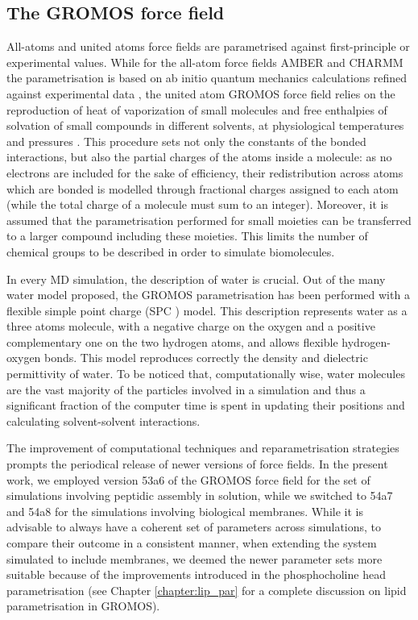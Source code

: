 \subsection{The GROMOS force field}
All-atoms and united atoms force fields are parametrised against first-principle or experimental values.
%
While for the all-atom force fields AMBER and CHARMM the parametrisation is based on ab initio quantum mechanics calculations refined against experimental data \cite{Maier2015,Dickson2014,Wang2004_amber,MacKerell1998,Klauda2010}, the united atom GROMOS force field relies on the reproduction of heat of vaporization of small molecules and free enthalpies of solvation of small compounds in different solvents, at physiological temperatures and pressures \cite{Oostenbrink2005,Schmid2011,Reif2013}.
%
This procedure sets not only the constants of the bonded interactions, but also the partial charges of the atoms inside a molecule: as no electrons are included for the sake of efficiency, their redistribution across atoms which are bonded is modelled through fractional charges assigned to each atom (while the total charge of a molecule must sum to an integer).
%
Moreover, it is assumed that the parametrisation performed for small moieties can be transferred to a larger compound including these moieties. This limits the number of chemical groups to be described in order to simulate biomolecules.

In every MD simulation, the description of water is crucial. Out of the many water model proposed, the GROMOS parametrisation has been performed with a flexible simple point charge (SPC \cite{Berendsen1981}) model. This description represents water as a three atoms molecule, with a negative charge on the oxygen and a positive complementary one on the two hydrogen atoms, and allows flexible hydrogen-oxygen bonds. This model reproduces correctly the density and dielectric permittivity of water. To be noticed that, computationally wise, water molecules are the vast majority of the particles involved in a simulation and thus a significant fraction of the computer time is spent in updating their positions and calculating solvent-solvent interactions.

The improvement of computational techniques and reparametrisation strategies prompts the periodical release of newer versions of force fields. In the present work, we employed version 53a6 of the GROMOS force field \cite{Oostenbrink2004} for the set of simulations involving peptidic assembly in solution, while we switched to 54a7 \cite{Schmid2011} and 54a8 \cite{Reif2013} for the simulations involving biological membranes. While it is advisable to always have a coherent set of parameters across simulations, to compare their outcome in a consistent manner, when extending the system simulated to include membranes, we deemed the newer parameter sets more suitable because of the improvements introduced in the phosphocholine head parametrisation (see Chapter \ref{chapter:lip_par} for a complete discussion on lipid parametrisation in GROMOS).


